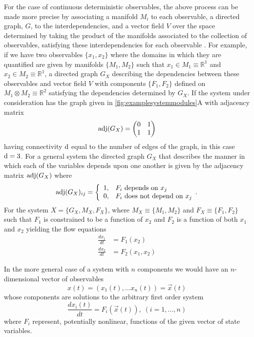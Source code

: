 For the case of continuous deterministic observables, the above process can be made more precise by associating a manifold $M_i$ to each observable, a directed graph, $G$, to the interdependencies, and a vector field $V$ over the space determined by taking the product of the manifolds associated to the collection of observables, satisfying these interdependencies for each observable  \cite{Deville}. For example, if we have two observables $\{x_1,x_2\}$ where the domains in which they are quantified are given by manifolds $\{M_1,M_2\}$ such that $x_1 \in M_1 \equiv \mathbb{R}^1$ and $x_2 \in M_2 \equiv \mathbb{R}^1$, a directed graph $G_X$ describing the dependencies between these observables and vector field $V$ with components $\{F_1,F_2\}$ defined on $M_1 \otimes M_2 \equiv \mathbb{R}^2$ satisfying the dependencies determined by $G_X$. If the system under consideration has the graph given in \ref{fig:examplesystemmodules}A
% 
with adjacency matrix
$$
\mathrm{adj}(G_X) = \begin{pmatrix}
0 & 1 \\
1 & 1
\end{pmatrix}
$$
having connectivity $\mathrm{d}$ equal to the number of edges of the graph, in this case $\mathrm{d} = 3$. For a general system the directed graph $G_X$ that describes the manner in which each of the variables depends upon one another is given by the adjacency matrix $\mathrm{adj}(G_X)$ where
 \begin{displaymath}
   \mathrm{adj}(G_X)_{ij} = \left\{
     \begin{array}{ll}
       1, & F_i \hbox{ depends on } x_j\\
       0, & F_i \hbox{ does not depend on } x_j
     \end{array}.
   \right.
\end{displaymath} For the system $X = \{G_X, M_X, F_X\}$, where $M_X \equiv \{M_1,M_2\}$ and $F_X \equiv \{F_1,F_2\}$ such that $F_1$ is constrained to be a function of $x_2$ and $F_2$ is a function of both $x_1$ and $x_2$ yielding the flow equations
\begin{align*}
\frac{dx_1}{dt} & = F_1(x_2)\\
\frac{dx_2}{dt} & = F_2(x_1,x_2)
\end{align*}

In the more general case of a system with $n$ components we would have an $n$-dimensional vector of observables
$$
x(t) = (x_1(t), \ldots x_n(t)) = \vec{x}(t)
$$
whose components are solutions to the arbitrary first order system
$$
\frac{dx_i(t)}{dt} = F_i(\vec{x}(t)), \; (i=1,\ldots,n)
$$
where $F_i$ represent, potentially nonlinear, functions of the given vector of state variables.

